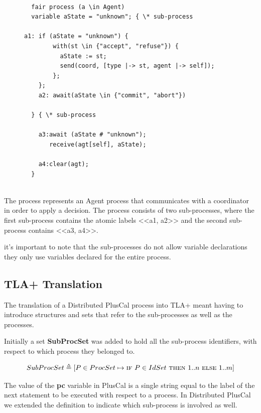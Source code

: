 \documentclass{thesul}
\newcommand{\IF}{\textsc{if}}
\newcommand{\THEN}{\textsc{then}}
\newcommand{\ELSE}{\textsc{else}}
\begin{document}
\begin{figure}[!h]
\label{2pcSub}
\begin{lstlisting}[caption = Distributed PlusCal Sub-Processes, frame = tlrb, firstnumber = 1]
   
  fair process (a \in Agent)
  variable aState = "unknown"; { \* sub-process

a1: if (aState = "unknown") {
        with(st \in {"accept", "refuse"}) {
          aState := st;
          send(coord, [type |-> st, agent |-> self]);
        };
    };
    a2: await(aState \in {"commit", "abort"})
    
  } { \* sub-process
    
    a3:await (aState # "unknown");
       receive(agt[self], aState); 
       
    a4:clear(agt);
  }

\end{lstlisting}
\end{figure}

\hfill\\

The process represents an Agent process that communicates with a coordinator in order to apply a decision. The process consists of two sub-processes, where the first sub-process contains the atomic labels <<a1, a2>> and the second sub-process contains <<a3, a4>>.

it's important to note that the sub-processes do not allow variable declarations they only use variables declared for the entire process.

\subsection{TLA+ Translation}

The translation of a Distributed PlusCal process into TLA+ meant having to introduce structures and sets that refer to the sub-processes as well as the processes.

Initially a set \textbf{SubProcSet} was added to hold all the sub-process identifiers, with respect to which process they belonged to.

\[
SubProcSet \triangleq [P \in ProcSet \mapsto \IF\ P \in IdSet\ \THEN\  1..n\ 
								\ELSE\  1..m ]
\]						  

The value of the \textbf{pc} variable in PlusCal is a single string equal to the label of the next statement to be executed with respect to a process. In Distributed PlusCal we extended the definition to indicate which sub-process is involved as well.
\end{document}
